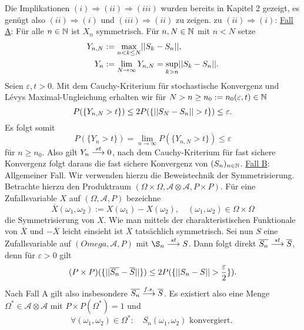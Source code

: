 \begin{proof*}%
    Die Implikationen $(i) \Rightarrow (ii) \Rightarrow (iii)$ wurden bereits in Kapitel 2 gezeigt, es genügt also $(ii) \Rightarrow (i)$ und $(iii) \Rightarrow (ii)$ zu zeigen. 
    \newline 
    zu $(ii) \Rightarrow (i)$: \underline{Fall A}: Für alle $n \in \mathbb{N}$ ist $X_n$ symmetrisch. 
    \newline 
    Für $n, N \in \mathbb{N}$ mit $n < N$ setze 
    \begin{align*}
        Y_{n,N} &:= \max_{n < k \leq N}\lvert \lvert S_k - S_n \rvert \rvert, \\\
        Y_n     &:= \lim_{N \to \infty} Y_{n,N} = \sup_{k > n} \lvert \lvert S_k - S_n \rvert \rvert. 
    \end{align*}
    Seien $\varepsilon, t > 0$. Mit dem Cauchy-Kriterium für stochastische Konvergenz und Lévys Maximal-Ungleichung erhalten wir für $N > n \geq n_0 := n_0(\varepsilon,t) \in \mathbb{N}$
    $$
        P(\{ Y_{n, N} > t\}) \leq 2P(\{ \lvert \lvert S_N - S_n \rvert \rvert > t\}) \leq \varepsilon . 
    $$
    Es folgt somit 
    $$
        P(\{Y_n > t \}) = \lim_{n \to \infty}P(\{Y_{n,N} > t \}) \leq \varepsilon
    $$
    für $n \geq n_0$. Also gilt $Y_n \overset{st}{\longrightarrow} 0$, nach dem Cauchy-Kriterium für fast sichere Konvergenz folgt daraus die fast sichere Konvergenz von $(S_n)_{n \in \mathbb{N}}$. 
    \newline \underline{Fall B}: Allgemeiner Fall.
    \newline 
    Wir verwenden hierzu die Beweistechnik der Symmetrisierung.  
    Betrachte hierzu den Produktraum $(\Omega \times \Omega, \mathcal{A}\otimes\mathcal{A}, P \times P)$. Für eine Zufallsvariable $X$ auf $(\Omega, \mathcal{A}, P)$ bezeichne
    $$
        \overline{X}(\omega_1, \omega_2) := X(\omega_1) - X(\omega_2), \quad (\omega_1, \omega_2) \in \Omega \times \Omega
    $$   
    die Symmetrisierung von $X$. Wie man mittels der charakteristischen Funktionale von $\overline{X}$ und $-\overline{X}$ leicht einsieht ist $\overline{X}$ tatsächlich symmetrisch. 
    Sei nun $S$ eine Zufallsvariable auf $(Omega, \mathcal{A}, P)$ mit $\S_n \stochastisch S$. Dann folgt direkt $\overline{S_n} \overset{st}{\longrightarrow} \overline{S}$, denn für $\varepsilon > 0$ gilt
    $$
        (P\times P)(\{ \lvert \lvert \overline{S_n} - \overline{S} \rvert \rvert\}) \leq 2P(\{ \lvert \lvert S_n - S \rvert \rvert > \frac{\varepsilon}{2} \}).
    $$
    Nach Fall A gilt also insbesondere $\overline{S_n} \overset{f.s.}{\longrightarrow}  \overline{S}$. Es existiert also eine Menge $\Omega^* \in \mathcal{A}\otimes\mathcal{A}$ mit $P\times P(\Omega^*) = 1$ und
    $$  
        \forall (\omega_1, \omega_2) \in \Omega^*: \quad \overline{S_n}(\omega_1, \omega_2) \text{ konvergiert. }
$$
\end{proof*}
